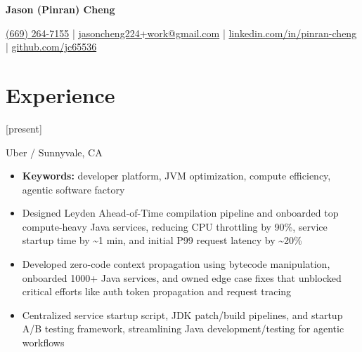 \documentclass{article}
\begin{document}

\newcommand{\sectioncolor}[2]{\colorlet{rule_color}{#2}\section*{#1}}

\begin{center}

  \Large \textbf{Jason (Pinran) Cheng}

  \normalsize
  \href{tel:+1-669-264-7155}{(669) 264-7155}
  | \href{mailto:jasoncheng224+work@gmail.com}{jasoncheng224+work@gmail.com}
  | \href{https://www.linkedin.com/in/pinran-cheng/}{linkedin.com/in/pinran-cheng}
  | \href{https://github.com/jc65536}{github.com/jc65536}
\end{center}

\sectioncolor{Experience}{blue}

[present]

Uber / Sunnyvale, CA

\begin{itemize}
  \item
  \textbf{Keywords:} developer platform, JVM optimization, compute efficiency,
  agentic software factory

  \item
  Designed Leyden Ahead-of-Time compilation pipeline and onboarded top
  compute-heavy Java services, reducing CPU throttling by 90\%, service startup
  time by \textasciitilde 1 min, and initial P99 request latency by
  \textasciitilde 20\%

  \item
  Developed zero-code context propagation using bytecode manipulation, onboarded
  1000+ Java services, and owned edge case fixes that unblocked critical efforts
  like auth token propagation and request tracing

  \item
  Centralized service startup script, JDK patch/build pipelines, and startup A/B
  testing framework, streamlining Java development/testing for agentic workflows
\end{itemize}
\end{document}

